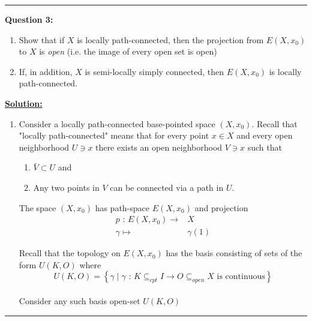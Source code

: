 \documentclass[11pt]{article}
\begin{document}
\vskip 0.5cm
\hrule
\pagebreak





\begin{bluebox}
  \textbf{Question 3:} 
  \begin{enumerate}[label=(\alph*)]
    \item Show that if $X$ is locally path-connected, then the projection from $E(X, x_0)$ to $X$ is \textit{open} (i.e. the image of every open set is open)
    \item If, in addition, $X$ is semi-locally simply connected, then $E(X, x_0)$ is locally path-connected. 
  \end{enumerate}
\end{bluebox}

\vskip 0.5cm
\textbf{\underline{Solution:}}
\\
\begin{enumerate}[label=(\alph*)]
  \item Consider a locally path-connected base-pointed space $(X, x_0)$. Recall that "locally path-connected" means that for every point $x \in X$ and every open neighborhood $U \ni x$ there exists an open neighborhood $V \ni x$ such that 
  \begin{enumerate}
    \item $\bar{V} \subset U$ and
    \item Any two points in $V$ can be connected via a path in $U$.
  \end{enumerate}

  The space $(X, x_0)$ has path-space $E(X, x_0)$ and projection 
  \begin{align*}
    p \text{ : } E(X, x_0) \rightarrow &X \\
                    \gamma \mapsto &\gamma(1)
  \end{align*}

  Recall that the topology on $E(X, x_0)$ has the basis consisting of sets of the form $U(K, O)$ where
  $$ U(K, O) = \left\{ \gamma \;|\; \gamma \text{ : } K \subseteq_{cpt} I \rightarrow O \subseteq_{open} X \text{ is continuous} \right\} $$
  \\
  Consider any such basis open-set $U(K, O)$  
\end{enumerate}

\vskip 0.5cm
\hrule
\pagebreak










% 
\end{document}
